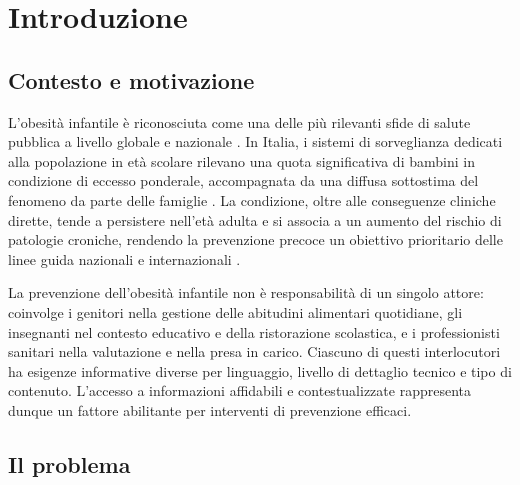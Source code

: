 %

\chapter{Introduzione}
\label{cap:introduzione}

\section{Contesto e motivazione}
\label{sec:contesto}

L'obesit\`a infantile \`e riconosciuta come una delle pi\`u rilevanti sfide di
salute pubblica a livello globale e nazionale \cite{who_obesity}. In Italia, i
sistemi di sorveglianza dedicati alla popolazione in et\`a scolare rilevano una
quota significativa di bambini in condizione di eccesso ponderale, accompagnata
da una diffusa sottostima del fenomeno da parte delle famiglie
\cite{okkio}. La condizione, oltre alle conseguenze cliniche dirette, tende a
persistere nell'et\`a adulta e si associa a un aumento del rischio di patologie
croniche, rendendo la prevenzione precoce un obiettivo prioritario delle linee
guida nazionali e internazionali \cite{linee_guida_ministero}.

La prevenzione dell'obesit\`a infantile non \`e responsabilit\`a di un singolo
attore: coinvolge i genitori nella gestione delle abitudini alimentari
quotidiane, gli insegnanti nel contesto educativo e della ristorazione
scolastica, e i professionisti sanitari nella valutazione e nella presa in
carico. Ciascuno di questi interlocutori ha esigenze informative diverse per
linguaggio, livello di dettaglio tecnico e tipo di contenuto. L'accesso a
informazioni affidabili e contestualizzate rappresenta dunque un fattore
abilitante per interventi di prevenzione efficaci.

\section{Il problema}
\label{sec:problema}

